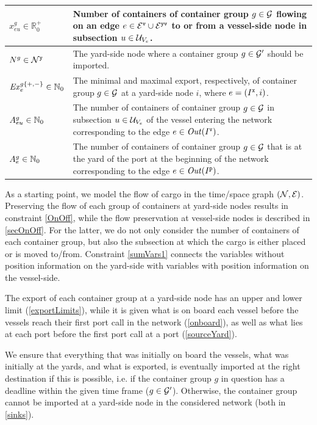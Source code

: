 \begin{table}[width=.9\linewidth,cols=2,pos=h]
\begin{tabular*}{\tblwidth}{@{} Lp{11cm} @{}}
$x^{g}_{eu}\in\mathbb{R}^+_0$		& Number of containers of container group $g\in\mathcal{G}$ flowing on an edge $e\in\mathcal{E}^\texttt{v}\cup\mathcal{E}^\texttt{yv}$ to or from a vessel-side node in subsection $u\in \mathcal{U}_{V_e}$.\\
\midrule
$N^g\in\mathcal{N}^\texttt{y}$		 		& The yard-side node where a container group $g\in \mathcal{G}'$ should be imported.\\
$\mathit{Ex}^{g\{+,-\}}_e\in\mathbb{N}_0$	
									& The minimal and maximal export, respectively, of container group $g\in \mathcal{G}$ at a yard-side node $i$, where $e=(I^\texttt{x},i)$.\\
$A^{g}_{eu}\in \mathbb{N}_0$			& The number of containers of container group $g\in\mathcal{G}$ in subsection $u\in \mathcal{U}_{V_e}$ of the vessel entering the network corresponding to the edge $e\in\mathit{Out}(I^\texttt{v})$.\\
$A^g_e\in \mathbb{N}_0$					& The number of containers of container group $g\in \mathcal{G}$ that is at the yard of the port at the beginning of the network corresponding to the edge $e\in\mathit{Out}(I^\texttt{p})$.\\
\bottomrule
\end{tabular*}
\end{table}

As a starting point, we model the flow of cargo in the time/space graph $(\mathcal{N},\mathcal{E})$. Preserving the flow of each group of containers at yard-side nodes results in constraint \eqref{OnOff}, while the flow preservation at vessel-side nodes is described in \eqref{secOnOff}. 
For the latter, we do not only consider the number of containers of each container group, but also the subsection at which the cargo is either placed or is moved to/from. Constraint \eqref{sumVars1} connects the variables without position information on the yard-side with variables with position information on the vessel-side. 

The export of each container group at a yard-side node has an upper and lower limit (\ref{exportLimits}), while it is given what is on board each vessel before the vessels reach their first port call in the network (\ref{onboard}), as well as what lies at each port before the first port call at a port (\ref{sourceYard}).

We ensure that everything that was initially on board the vessels, what was initially at the yards, and what is exported, is eventually imported at the right destination if this is possible, i.e. if the container group $g$ in question has a deadline within the given time frame ($g\in\mathcal{G}'$). Otherwise, the container group cannot be imported at a yard-side node in the considered network (both in \eqref{sinks}).  

